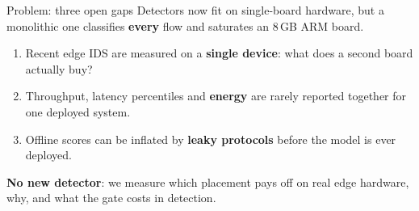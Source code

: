 \documentclass{article}
\newcommand{\key}[1]{\textbf{\textcolor{accBlue}{#1}}}
\newcommand{\bad}[1]{\textbf{\textcolor{accRed}{#1}}}
\begin{document}
\noindent\box\topPart\par
\newlength\colheight\setlength\colheight{905mm}
\newsavebox\colL\newsavebox\colR
\begin{lrbox}{\colL}%
\begin{minipage}[t][\colheight][t]{381mm}\vspace{0pt}%
\begin{sect}{Problem: three open gaps}
  Detectors now fit on single-board hardware, but a monolithic one classifies
  \key{every} flow and saturates an 8\,GB ARM board.
  \begin{enumerate}
    \item Recent edge IDS are measured on a \bad{single device}: what does a
          second board actually buy?
    \item Throughput, latency percentiles and \bad{energy} are rarely reported
          together for one deployed system.
    \item Offline scores can be inflated by \bad{leaky protocols} before the
          model is ever deployed.
  \end{enumerate}
  \begin{takeaway}
    \textbf{No new detector}: we measure which placement pays off on real
    edge hardware, why, and what the gate costs in detection.
  \end{takeaway}
\end{sect}


\end{minipage}
\end{lrbox}
\end{document}
